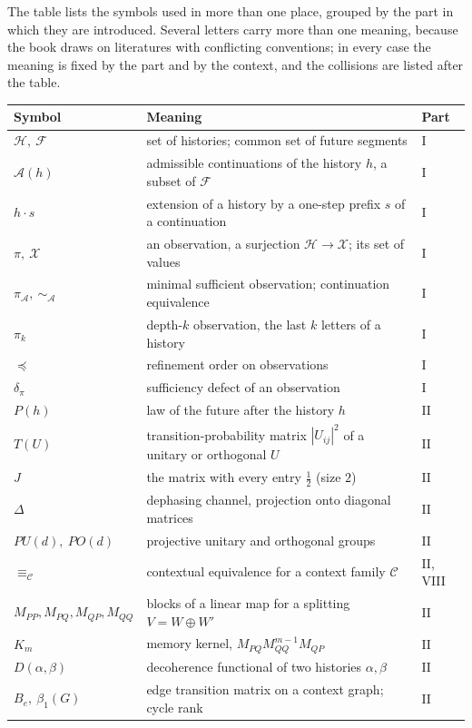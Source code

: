 \documentclass[11pt,oneside]{book}
\theoremstyle{definition}
\theoremstyle{remark}
\newcommand{\Hist}{\mathcal{H}}
\newcommand{\Fut}{\mathcal{F}}
\newcommand{\Adm}{\mathcal{A}}
\newcommand{\Obs}{\mathcal{X}}
\begin{document}
The table lists the symbols used in more than one place, grouped by the part in which they are introduced. Several letters carry more than one meaning, because the book draws on literatures with conflicting conventions; in every case the meaning is fixed by the part and by the context, and the collisions are listed after the table.

\begin{longtable}{p{2.7cm}p{8.6cm}p{2.0cm}}
\hline
Symbol & Meaning & Part \\
\hline
\endhead
$\Hist,\ \Fut$ & set of histories; common set of future segments & I \\
$\Adm(h)$ & admissible continuations of the history $h$, a subset of $\Fut$ & I \\
$h\cdot s$ & extension of a history by a one-step prefix $s$ of a continuation & I \\
$\pi,\ \Obs$ & an observation, a surjection $\Hist\to\Obs$; its set of values & I \\
$\pi_\Adm,\ \sim_\Adm$ & minimal sufficient observation; continuation equivalence & I \\
$\pi_k$ & depth-$k$ observation, the last $k$ letters of a history & I \\
$\preceq$ & refinement order on observations & I \\
$\delta_\pi$ & sufficiency defect of an observation & I \\
$P(h)$ & law of the future after the history $h$ & II \\
$T(U)$ & transition-probability matrix $|U_{ij}|^2$ of a unitary or orthogonal $U$ & II \\
$J$ & the matrix with every entry $\tfrac12$ (size $2$) & II \\
$\Delta$ & dephasing channel, projection onto diagonal matrices & II \\
$PU(d),\ PO(d)$ & projective unitary and orthogonal groups & II \\
$\equiv_{\mathcal C}$ & contextual equivalence for a context family $\mathcal C$ & II, VIII \\
$M_{PP},M_{PQ},M_{QP},M_{QQ}$ & blocks of a linear map for a splitting $V=W\oplus W'$ & II \\
$K_m$ & memory kernel, $M_{PQ}M_{QQ}^{m-1}M_{QP}$ & II \\
$D(\alpha,\beta)$ & decoherence functional of two histories $\alpha,\beta$ & II \\
$B_e,\ \beta_1(G)$ & edge transition matrix on a context graph; cycle rank & II \\

\end{longtable}
\end{document}
